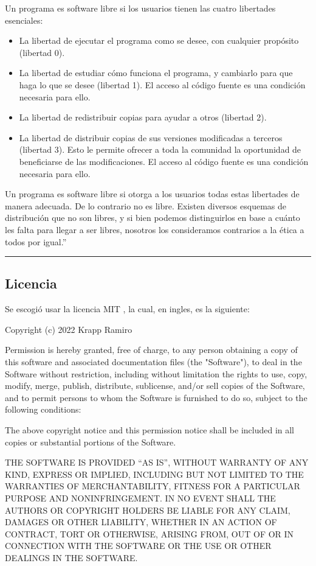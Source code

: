 \documentclass[../informe_krapp.tex]{subfiles}
\begin{document}
{Un programa es software libre si los usuarios tienen las cuatro libertades esenciales:
\begin{itemize}
	\item La libertad de ejecutar el programa como se desee, con cualquier propósito (libertad 0).
	\item La libertad de estudiar cómo funciona el programa, y cambiarlo para que haga lo que se desee (libertad 1). El acceso al código fuente es una condición necesaria para ello.
	\item La libertad de redistribuir copias para ayudar a otros (libertad 2).
	\item La libertad de distribuir copias de sus versiones modificadas a terceros (libertad 3). Esto le permite ofrecer a toda la comunidad la oportunidad de beneficiarse de las modificaciones. El acceso al código fuente es una condición necesaria para ello.
\end{itemize}

Un programa es software libre si otorga a los usuarios todas estas libertades de manera adecuada. De lo contrario no es libre. Existen diversos esquemas de distribución que no son libres, y si bien podemos distinguirlos en base a cuánto les falta para llegar a ser libres, nosotros los consideramos contrarios a la ética a todos por igual.''
\begin{center}
	\rule{0.8\textwidth}{0.3pt}
\end{center}

\clearpage

\subsection{Licencia}
Se escogió usar la licencia MIT \cite{mit}, la cual, en ingles, es la siguiente:

Copyright (c) 2022 Krapp Ramiro

Permission is hereby granted, free of charge, to any person obtaining a copy
of this software and associated documentation files (the "Software"), to deal
in the Software without restriction, including without limitation the rights
to use, copy, modify, merge, publish, distribute, sublicense, and/or sell
copies of the Software, and to permit persons to whom the Software is
furnished to do so, subject to the following conditions:

The above copyright notice and this permission notice shall be included in all
copies or substantial portions of the Software.

THE SOFTWARE IS PROVIDED ``AS IS'', WITHOUT WARRANTY OF ANY KIND, EXPRESS OR
IMPLIED, INCLUDING BUT NOT LIMITED TO THE WARRANTIES OF MERCHANTABILITY,
FITNESS FOR A PARTICULAR PURPOSE AND NONINFRINGEMENT. IN NO EVENT SHALL THE
AUTHORS OR COPYRIGHT HOLDERS BE LIABLE FOR ANY CLAIM, DAMAGES OR OTHER
LIABILITY, WHETHER IN AN ACTION OF CONTRACT, TORT OR OTHERWISE, ARISING FROM,
OUT OF OR IN CONNECTION WITH THE SOFTWARE OR THE USE OR OTHER DEALINGS IN THE
SOFTWARE.
}
\end{document}
